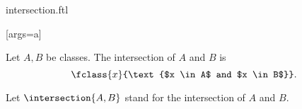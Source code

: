 \documentclass{article}
\begin{document}
\begin{smodule}[creators={Marcel Schütz}]{intersection.ftl}

  [args=a]{}

  \begin{fdefinition*}[label=5744033011859456]
    Let $A, B$ be classes.
    The intersection of $A$ and $B$ is
    \[\fclass{x}{\text{$x \in A$ and $x \in B$}}.\]

    Let $\intersection{A,B}$ stand for the intersection of $A$ and $B$.
  \end{fdefinition*}
\end{smodule}
\end{document}
